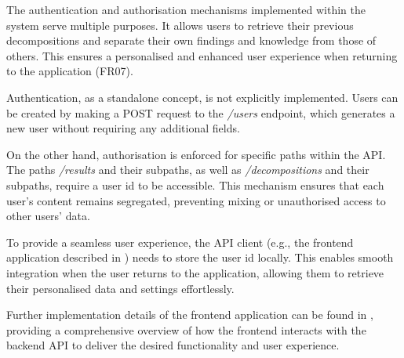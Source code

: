 The authentication and authorisation mechanisms implemented within the system
serve multiple purposes. It allows users to retrieve their previous
decompositions and separate their own findings and knowledge from those of
others. This ensures a personalised and enhanced user experience when returning
to the application (FR07).

Authentication, as a standalone concept, is not explicitly implemented. Users
can be created by making a POST request to the \textit{/users} endpoint, which
generates a new user without requiring any additional fields.

On the other hand, authorisation is enforced for specific paths within the API.
The paths \textit{/results} and their subpaths, as well as
\textit{/decompositions} and their subpaths, require a user id to be
accessible. This mechanism ensures that each user's content remains segregated,
preventing mixing or unauthorised access to other users' data.

To provide a seamless user experience, the API client (e.g., the frontend
application described in ) needs to store the user id
locally. This enables smooth integration when the user returns to the
application, allowing them to retrieve their personalised data and settings
effortlessly.

Further implementation details of the frontend application can be found in
, providing a comprehensive overview of how the
frontend interacts with the backend API to deliver the desired functionality
and user experience.
